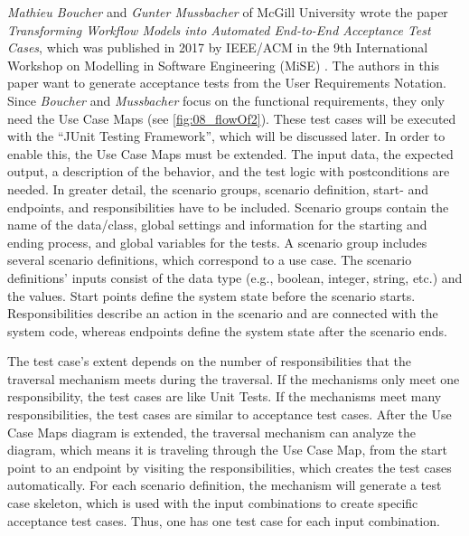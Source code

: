 \textit{Mathieu Boucher} and \textit{Gunter Mussbacher} of McGill University wrote the paper \textit{Transforming Workflow Models into Automated End-to-End Acceptance Test Cases}, which was published in 2017 by IEEE/ACM in the 9th International Workshop on Modelling in Software Engineering (MiSE) \cite{BoucherMussbacher2017}.
\newpage
The authors in this paper want to generate acceptance tests from the User Requirements Notation. Since \textit{Boucher} and \textit{Mussbacher} focus on the functional requirements, they only need the Use Case Maps (see \autoref{fig:08_flowOf2}). These test cases will be executed with the \enquote{JUnit Testing Framework}, which will be discussed later. In order to enable this, the Use Case Maps must be extended. The input data, the expected output, a description of the behavior, and the test logic with postconditions are needed. In greater detail, the scenario groups, scenario definition, start- and endpoints, and responsibilities have to be included. Scenario groups contain the name of the data/class, global settings and information for the starting and ending process, and global variables for the tests. A scenario group includes several scenario definitions, which correspond to a use case. The scenario definitions' inputs consist of the data type (e.g., boolean, integer, string, etc.) and the values. Start points define the system state before the scenario starts. Responsibilities describe an action in the scenario and are connected with the system code, whereas endpoints define the system state after the scenario ends. 

The test case's extent depends on the number of responsibilities that the traversal mechanism meets during the traversal. If the mechanisms only meet one responsibility, the test cases are like Unit Tests. If the mechanisms meet many responsibilities, the test cases are similar to acceptance test cases. After the Use Case Maps diagram is extended, the traversal mechanism can analyze the diagram, which means it is traveling through the Use Case Map, from the start point to an endpoint by visiting the responsibilities, which creates the test cases automatically. For each scenario definition, the mechanism will generate a test case skeleton, which is used with the input combinations to create specific acceptance test cases. Thus, one has one test case for each input combination. 


